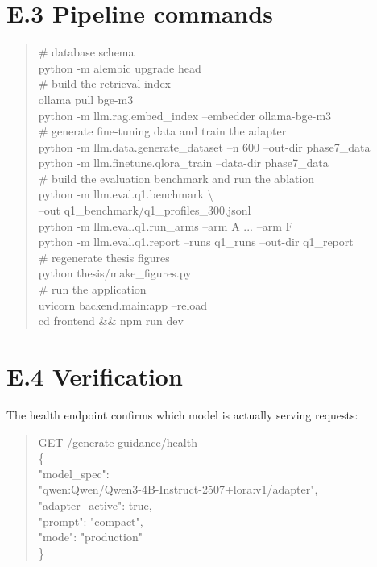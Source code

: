 \section*{E.3 Pipeline commands}

\begin{quote}\footnotesize\ttfamily\raggedright
\# database schema \\
python -m alembic upgrade head \\[4pt]
\# build the retrieval index \\
ollama pull bge-m3 \\
python -m llm.rag.embed\_index --embedder ollama-bge-m3 \\[4pt]
\# generate fine-tuning data and train the adapter \\
python -m llm.data.generate\_dataset --n 600 --out-dir phase7\_data \\
python -m llm.finetune.qlora\_train --data-dir phase7\_data \\[4pt]
\# build the evaluation benchmark and run the ablation \\
python -m llm.eval.q1.benchmark \textbackslash \\
\hspace*{2em}--out q1\_benchmark/q1\_profiles\_300.jsonl \\
python -m llm.eval.q1.run\_arms --arm A ... --arm F \\
python -m llm.eval.q1.report --runs q1\_runs --out-dir q1\_report \\[4pt]
\# regenerate thesis figures \\
python thesis/make\_figures.py \\[4pt]
\# run the application \\
uvicorn backend.main:app --reload \\
cd frontend \&\& npm run dev
\end{quote}

\section*{E.4 Verification}

The health endpoint confirms which model is actually serving requests:

\begin{quote}\footnotesize\ttfamily\raggedright
GET /generate-guidance/health \\[3pt]
\{ \\
\hspace*{1.5em}"model\_spec": \\
\hspace*{3em}"qwen:Qwen/Qwen3-4B-Instruct-2507+lora:v1/adapter", \\
\hspace*{1.5em}"adapter\_active": true, \\
\hspace*{1.5em}"prompt": "compact", \\
\hspace*{1.5em}"mode": "production" \\
\}
\end{quote}
